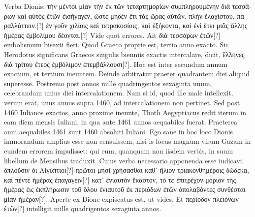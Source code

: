 Verba Dionis:
 \textgreek{τὴν μέντοι μίαν τὴν ἐκ τῶν τεταρτημορίων συμπληρουμένην
διὰ τεσσάρων καὶ αὐτὸς ἐτῶν ἐισήγαγεν, ὤστε μηδὲν ἔτι τὰς ὤρας αὐτῶν,
πλὴν ἐλαχίστου, παραλλάττειν.}[?]
\textgreek{ἐν γοῦν χιλίοις καὶ τετρακοσίοις, καὶ ἑξήκοντα,
καὶ ἑνὶ ἔτει μιᾶς ἄλλης ἡμέρας ἐμβολίμου δέονται.}[?]
Vide quot
errores.
Ait \textgreek{διὰ τεσσάρων ἐτῶν}[?] embolismum bisexti fieri.
Quod Graeco
proprie est, tertio anno exacto.
%
Sic Herodotus significans Graecos singulis
bienniis exactis intercalare, dicit, \textgreek{ἕλληνες διὰ τρίτου ἔτεος ἐμβόλιμον
ἐπεμβάλλουσι}[?].
Hoc est inter secundum annum exactum, et tertium
ineuntem.
Deinde arbitratur praeter quadrantem diei aliquid
superesse.
Postremo post annos mille quadringentos sexaginta unum,
celebrandam unius diei intercalationem.
Nam si id, quod ille male
intellexit, verum erat, unus annus supra 1460, ad intercalationem
non pertinet.
Sed post 1460 Iulianos exactos, anno proxime
ineunte, Thoth Aegyptiacus redit iterum in eam diem mensis Iuliani,
in qua ante 1461 annos aequabiles fuerat.
Praeterea anni aequabiles
1461 sunt 1460 absoluti Iuliani.
Ego sane in hoc loco Dionis
immorandum amplius esse non censuissem, nisi is locus magnum
virum Gazam in eundem errorem impulisset: qui eum, quanquam
non iisdem verbis, in suum libellum de Mensibus traduxit.
Cuius
verba necessario apponenda esse iudicavi.
\textgreek{δπλοῦσιν ὁι Αἰγύπτιοι[?] πρῶτοι
μησὶ χρήσασθαι καθ᾽ ἥλιον τριακονθημέροις δώδεκα, καὶ πέντε ἡμέρας ἐπαγαγέιν[?]
κατ᾽ ἐνιαυτὸν ἕκαστον, τό τε ἐπιτρέχον μόριον τὴς ἡμέρας ἐις ἐκπλήρωσιν
τοῦ ὅλου ὲνιαυτοῦ ἐκ περιόδων ἐτῶν ἀπολαβόντες συνθέσται μίαν ἡμέραν}[?].
Aperte
ex Dione expiscatus est, ut vides.
Et \textgreek{περίοδον πλειόνων ἐτῶν}[?] intelligit
mille quadrigentos sexaginta annos.
